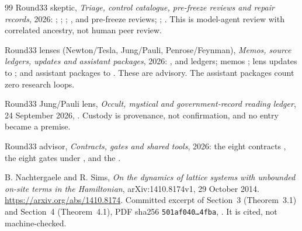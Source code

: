 \begin{thebibliography}{99}
Round33 skeptic,
\emph{Triage, control catalogue, pre-freeze reviews and repair records},
2026:
;
;
;
,
 and
 pre-freeze reviews;
;
.
This is model-agent review with correlated ancestry, not human peer review.

Round33 lenses (Newton/Tesla, Jung/Pauli, Penrose/Feynman),
\emph{Memos, source ledgers, updates and assistant packages}, 2026:
,
 and
 ledgers;
memos ; lens updates
 to ; and
assistant packages  to
.
These are advisory. The assistant packages count zero research loops.

Round33 Jung/Pauli lens,
\emph{Occult, mystical and government-record reading ledger}, 24 September
2026,
.
Custody is provenance, not confirmation, and no entry became a premise.

Round33 advisor,
\emph{Contracts, gates and shared tools}, 2026: the eight contracts
, the eight gates
 under ,
and the .

B. Nachtergaele and R. Sims,
\emph{On the dynamics of lattice systems with unbounded on-site terms in the
Hamiltonian}, arXiv:1410.8174v1, 29 October 2014.
\url{https://arxiv.org/abs/1410.8174}.
Committed excerpt of Section~3 (Theorem~3.1) and Section~4 (Theorem~4.1),
PDF sha256 \texttt{501af040\ldots4fba},
. It is cited, not machine-checked.


\end{thebibliography}
